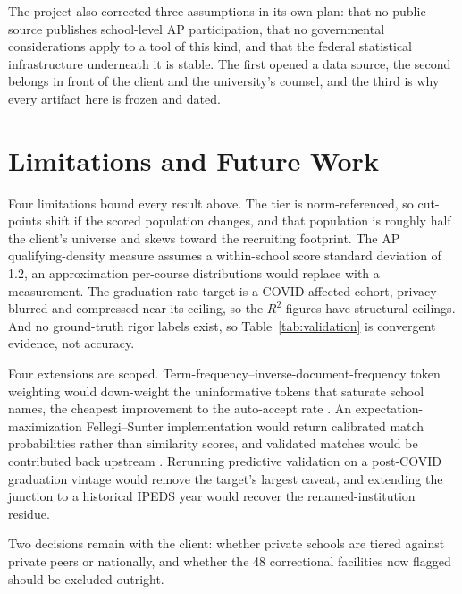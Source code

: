 \documentclass[12pt]{article}
\begin{document}
The project also corrected three assumptions in its own plan: that no public source publishes school-level AP participation, that no governmental considerations apply to a tool of this kind, and that the federal statistical infrastructure underneath it is stable. The first opened a data source, the second belongs in front of the client and the university's counsel, and the third is why every artifact here is frozen and dated.

\section{Limitations and Future Work}
\label{sec:future-work}

Four limitations bound every result above. The tier is norm-referenced, so cut-points shift if the scored population changes, and that population is roughly half the client's universe and skews toward the recruiting footprint. The AP qualifying-density measure assumes a within-school score standard deviation of 1.2, an approximation per-course distributions would replace with a measurement. The graduation-rate target is a COVID-affected cohort, privacy-blurred and compressed near its ceiling, so the $R^2$ figures have structural ceilings. And no ground-truth rigor labels exist, so Table~\ref{tab:validation} is convergent evidence, not accuracy.

Four extensions are scoped. Term-frequency--inverse-document-frequency token weighting would down-weight the uninformative tokens that saturate school names, the cheapest improvement to the auto-accept rate \citep{cohen2003}. An expectation-maximization Fellegi--Sunter implementation would return calibrated match probabilities rather than similarity scores, and validated matches would be contributed back upstream \citep{enamorado2019,binette2022,ucboulder_crosswalk}. Rerunning predictive validation on a post-COVID graduation vintage would remove the target's largest caveat, and extending the junction to a historical IPEDS year would recover the renamed-institution residue.

Two decisions remain with the client: whether private schools are tiered against private peers or nationally, and whether the 48 correctional facilities now flagged should be excluded outright.

\end{document}
